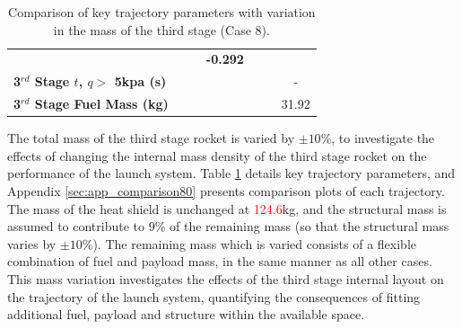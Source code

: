 \begin{table}[ht]
\begin{tabular}{l c c c c c c}
		& \textbf{\thirddExergyEffmThreeOneHundredFiveNoReturn}
		& \textbf{\thirddExergyEffmThreeOneHundredTenNoReturn}
		& \textbf{-0.292}
		\\
		\textbf{3$^{rd}$ Stage $t$, $q >$ 5kpa (s)}
		& \thirdqOverFivemThreeNinetyNoReturn
		& \thirdqOverFivemThreeNinetyFiveNoReturn
		& \thirdqOverFivemThreeStandardNoReturn
		& \thirdqOverFivemThreeOneHundredFiveNoReturn
		& \thirdqOverFivemThreeOneHundredTenNoReturn
		& -
		\\
		\textbf{3$^{rd}$ Stage Fuel Mass (kg)}
		& \thirdmFuelmThreeNinetyNoReturn
		& \thirdmFuelmThreeNinetyFiveNoReturn
		& \thirdmFuelmThreeStandardNoReturn
		& \thirdmFuelmThreeOneHundredFiveNoReturn
		& \thirdmFuelmThreeOneHundredTenNoReturn
		&31.92
		\\
		\hline 
	\end{tabular} 
	\caption{Comparison of key trajectory parameters with variation in the mass of the third stage (Case 8).}
	\label{tab:comparison80}
\end{table}


The total mass of the third stage rocket is varied by $\pm10\%$, to investigate the effects of changing the internal mass density of the third stage rocket on the performance of the launch system. Table \ref{tab:comparison80} details key trajectory parameters, and Appendix \ref{sec:app_comparison80} presents comparison plots of each trajectory.
The mass of the heat shield is unchanged at \textcolor{red}{124.6}kg, and the structural mass is assumed to contribute to 9\% of the remaining mass (so that the structural mass varies by $\pm10\%$). The remaining mass which is varied consists of a flexible combination of fuel and payload mass, in the same manner as all other cases. 
This mass variation investigates the effects of the third stage internal layout on the trajectory of the launch system, quantifying the consequences of fitting additional fuel, payload and structure within the available space.

